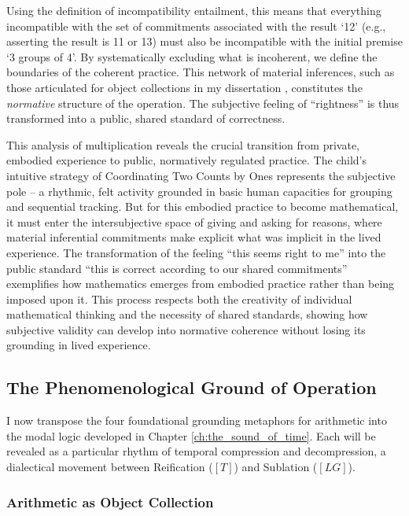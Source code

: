 \documentclass[12pt]{book}
\begin{document}
Using the definition of incompatibility entailment, this means that everything incompatible with the set of commitments associated with the result `12' (e.g., asserting the result is 11 or 13) must also be incompatible with the initial premise `3 groups of 4'. By systematically excluding what is incoherent, we define the boundaries of the coherent practice. This network of material inferences, such as those articulated for object collections in my dissertation \parencite{savich2022}, constitutes the \textit{normative} structure of the operation. The subjective feeling of ``rightness'' is thus transformed into a public, shared standard of correctness.

This analysis of multiplication reveals the crucial transition from private, embodied experience to public, normatively regulated practice. The child's intuitive strategy of Coordinating Two Counts by Ones represents the subjective pole -- a rhythmic, felt activity grounded in basic human capacities for grouping and sequential tracking. But for this embodied practice to become mathematical, it must enter the intersubjective space of giving and asking for reasons, where material inferential commitments make explicit what was implicit in the lived experience. The transformation of the feeling ``this seems right to me'' into the public standard ``this is correct according to our shared commitments'' exemplifies how mathematics emerges from embodied practice rather than being imposed upon it. This process respects both the creativity of individual mathematical thinking and the necessity of shared standards, showing how subjective validity can develop into normative coherence without losing its grounding in lived experience.


\subsection{The Phenomenological Ground of Operation}

I now transpose the four foundational grounding metaphors for arithmetic into the modal logic developed in Chapter \ref{ch:the_sound_of_time}. Each will be revealed as a particular rhythm of temporal compression and decompression, a dialectical movement between Reification ($[T]$) and Sublation ($[LG]$).

\subsubsection{Arithmetic as Object Collection}
\end{document}
